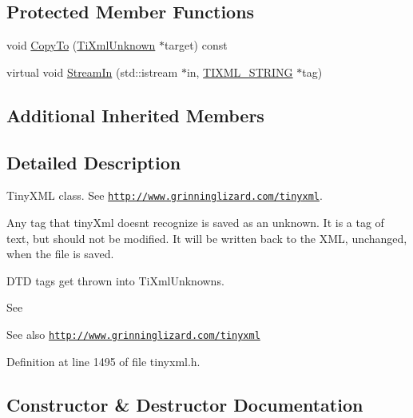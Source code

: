 \subsection*{Protected Member Functions}
\begin{DoxyCompactItemize}
\item 
void \hyperlink{class_ti_xml_unknown_afeb334446bcbe13ce15131e1629712be}{Copy\+To} (\hyperlink{class_ti_xml_unknown}{Ti\+Xml\+Unknown} $\ast$target) const
\item 
virtual void \hyperlink{class_ti_xml_unknown_ad3f8fcc1efe364ddd8f43ef9a1046300}{Stream\+In} (std\+::istream $\ast$in, \hyperlink{tinyxml_8h_a92bada05fd84d9a0c9a5bbe53de26887}{T\+I\+X\+M\+L\+\_\+\+S\+T\+R\+I\+NG} $\ast$tag)
\end{DoxyCompactItemize}
\subsection*{Additional Inherited Members}


\subsection{Detailed Description}
Tiny\+X\+ML class. See \href{http://www.grinninglizard.com/tinyxml}{\tt http\+://www.\+grinninglizard.\+com/tinyxml}. 

Any tag that tiny\+Xml doesn\textquotesingle{}t recognize is saved as an unknown. It is a tag of text, but should not be modified. It will be written back to the X\+ML, unchanged, when the file is saved.

D\+TD tags get thrown into Ti\+Xml\+Unknowns.

See \begin{DoxySeeAlso}{See also}
\href{http://www.grinninglizard.com/tinyxml}{\tt http\+://www.\+grinninglizard.\+com/tinyxml} 
\end{DoxySeeAlso}


Definition at line 1495 of file tinyxml.\+h.



\subsection{Constructor \& Destructor Documentation}
\hypertarget{class_ti_xml_unknown_a945f09b3c6538099c69fc563216750c3}{}\label{class_ti_xml_unknown_a945f09b3c6538099c69fc563216750c3} 
